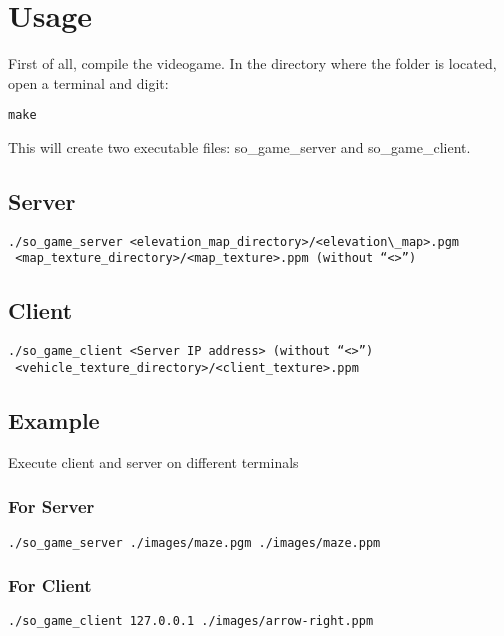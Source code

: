 \documentclass{report}
\begin{document}
\chapter{Usage}
First of all, compile the videogame. In the directory where the folder is located, open a terminal and
digit:
\begin{verbatim}
make
\end{verbatim}
This will create two executable files: so\_game\_server and so\_game\_client.
\section{Server}
\begin{verbatim}
./so_game_server <elevation_map_directory>/<elevation\_map>.pgm 
 <map_texture_directory>/<map_texture>.ppm (without “<>”)
\end{verbatim}
\section{Client}
\begin{verbatim}
./so_game_client <Server IP address> (without “<>”) 
 <vehicle_texture_directory>/<client_texture>.ppm
\end{verbatim}
\section{Example}
Execute client and server on different terminals
\subsection{For Server}
\begin{verbatim}
./so_game_server ./images/maze.pgm ./images/maze.ppm
\end{verbatim}
\subsection{For Client}
\begin{verbatim}
./so_game_client 127.0.0.1 ./images/arrow-right.ppm
\end{verbatim}
\end{document}
